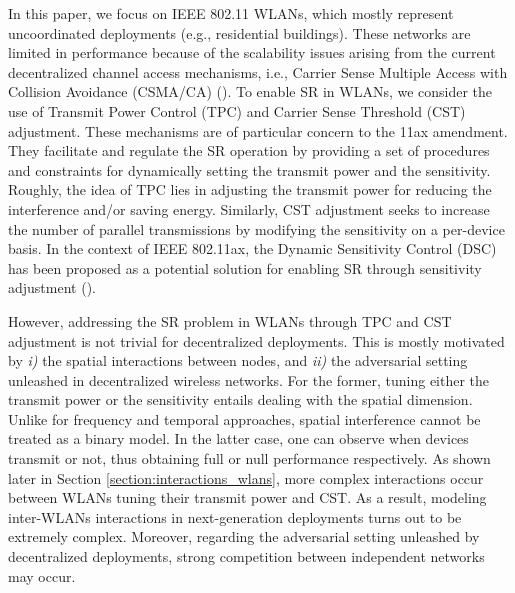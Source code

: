 \documentclass{article}
\begin{document}
In this paper, we focus on IEEE 802.11 WLANs, which mostly represent uncoordinated deployments (e.g., residential buildings). These networks are limited in performance because of the scalability issues arising from the current decentralized channel access mechanisms, i.e., Carrier Sense Multiple Access with Collision Avoidance (CSMA/CA) (\citealp{ergin2007understanding}). To enable SR in WLANs, we consider the use of Transmit Power Control (TPC) and Carrier Sense Threshold (CST) adjustment. These mechanisms are of particular concern to the 11ax amendment. They facilitate and regulate the SR operation by providing a set of procedures and constraints for dynamically setting the transmit power and the sensitivity. Roughly, the idea of TPC lies in adjusting the transmit power for reducing the interference and/or saving energy. Similarly, CST adjustment seeks to increase the number of parallel transmissions by modifying the sensitivity on a per-device basis. In the context of IEEE 802.11ax, the Dynamic Sensitivity Control (DSC) has been proposed as a potential solution for enabling SR through sensitivity adjustment (\citealp{smith2015dynamic}).

However, addressing the SR problem in WLANs through TPC and CST adjustment is not trivial for decentralized deployments. This is mostly motivated by \emph{i)} the spatial interactions between nodes, and \emph{ii)} the adversarial setting unleashed in decentralized wireless networks. For the former, tuning either the transmit power or the sensitivity entails dealing with the spatial dimension. Unlike for frequency and temporal approaches, spatial interference cannot be treated as a binary model. In the latter case, one can observe when devices transmit or not, thus obtaining full or null performance respectively. As shown later in Section \ref{section:interactions_wlans}, more complex interactions occur between WLANs tuning their transmit power and CST. As a result, modeling inter-WLANs interactions in next-generation deployments turns out to be extremely complex. Moreover, regarding the adversarial setting unleashed by decentralized deployments, strong competition between independent networks may occur. 
\end{document}
